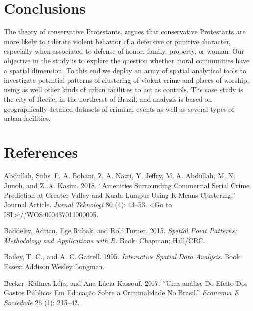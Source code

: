 \documentclass[smallextended]{svjour3}       %
\begin{document}
\hypertarget{conclusions}{%
\section{Conclusions}\label{conclusions}}

The theory of conservative Protestants, argues that conservative
Protestants are more likely to tolerate violent behavior of a defensive
or punitive character, especially when associated to defense of honor,
family, property, or woman. Our objective in the study is to explore the
question whether moral communities have a spatial dimension. To this end
we deploy an array of spatial analytical tools to investigate potential
patterns of clustering of violent crime and places of worship, using as
well other kinds of urban facilities to act as controls. The case study
is the city of Recife, in the northeast of Brazil, and analysis is based
on geographically detailed datasets of criminal events as well as
several types of urban facilities.

\hypertarget{references}{%
\section*{References}\label{references}}

\hypertarget{refs}{}
\leavevmode\hypertarget{ref-Abdullah2018amenities}{}%
Abdullah, Snhs, F. A. Bohani, Z. A. Nazri, Y. Jeffry, M. A. Abdullah, M.
N. Junoh, and Z. A. Kasim. 2018. ``Amenities Surrounding Commercial
Serial Crime Prediction at Greater Valley and Kuala Lumpur Using K-Means
Clustering.'' Journal Article. \emph{Jurnal Teknologi} 80 (4): 43--53.
\href{\%3CGo\%20to\%20ISI\%3E://WOS:000437011000005}{\textless{}Go to ISI\textgreater{}://WOS:000437011000005}.

\leavevmode\hypertarget{ref-Baddeley2015spatial}{}%
Baddeley, Adrian, Ege Rubak, and Rolf Turner. 2015. \emph{Spatial Point
Patterns: Methodology and Applications with R}. Book. Chapman; Hall/CRC.

\leavevmode\hypertarget{ref-Bailey1995interactive}{}%
Bailey, T. C., and A. C. Gatrell. 1995. \emph{Interactive Spatial Data
Analysis}. Book. Essex: Addison Wesley Longman.

\leavevmode\hypertarget{ref-Becker2017analise}{}%
Becker, Kalinca Léia, and Ana Lúcia Kassouf. 2017. ``Uma análise Do
Efeito Dos Gastos Públicos Em Educação Sobre a Criminalidade No
Brasil.'' \emph{Economia E Sociedade} 26 (1): 215--42.
\end{document}
